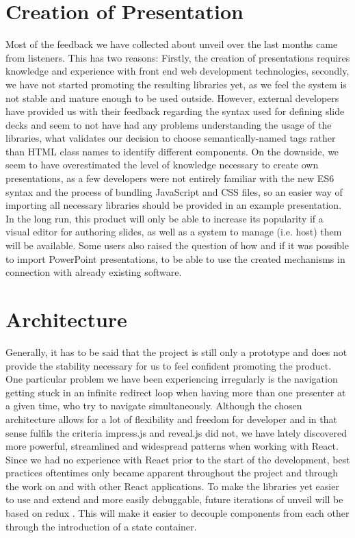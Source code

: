 \section{Creation of Presentation}
Most of the feedback we have collected about unveil over the last months came from listeners. This has two reasons: Firstly, the creation of presentations requires knowledge and experience with front end web development technologies, secondly, we have not started promoting the resulting libraries yet, as we feel the system is not stable and mature enough to be used outside. However, external developers have provided us with their feedback regarding the syntax used for defining slide decks and seem to not have had any problems understanding the usage of the libraries, what validates our decision to choose semantically-named tags rather than HTML class names to identify different components. On the downside, we seem to have overestimated the level of knowledge necessary to create own presentations, as a few developers were not entirely familiar with the new ES6 syntax and the process of bundling JavaScript and CSS files, so an easier way of importing all necessary libraries should be provided in an example presentation.
In the long run, this product will only be able to increase its popularity if a visual editor for authoring slides, as well as a system to manage (i.e. host) them will be available. Some users also raised the question of how and if it was possible to import PowerPoint presentations, to be able to use the created mechanisms in connection with already existing software.

\section{Architecture}
Generally, it has to be said that the project is still only a prototype and does not provide the stability necessary for us to feel confident promoting the product. One particular problem we have been experiencing irregularly is the navigation getting stuck in an infinite redirect loop when having more than one presenter at a given time, who try to navigate simultaneously. 
Although the chosen architecture allows for a lot of flexibility and freedom for developer and in that sense fulfils the criteria impress.js and reveal.js did not, we have lately discovered more powerful, streamlined and widespread patterns when working with React. Since we had no experience with React prior to the start of the development, best practices oftentimes only became apparent throughout the project and through the work on and with other React applications. To make the libraries yet easier to use and extend and more easily debuggable, future iterations of unveil will be based on redux \cite{redux}. This will make it easier to decouple components from each other through the introduction of a state container.